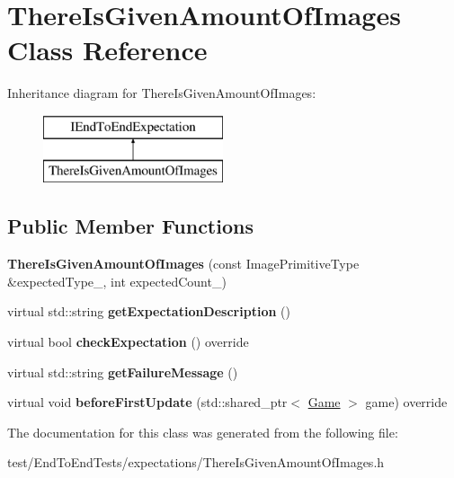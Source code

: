 \hypertarget{classThereIsGivenAmountOfImages}{}\section{There\+Is\+Given\+Amount\+Of\+Images Class Reference}
\label{classThereIsGivenAmountOfImages}
Inheritance diagram for There\+Is\+Given\+Amount\+Of\+Images\+:\begin{figure}[H]
\begin{center}
\leavevmode
\includegraphics[height=2.000000cm]{classThereIsGivenAmountOfImages}
\end{center}
\end{figure}
\subsection*{Public Member Functions}
\begin{DoxyCompactItemize}
\item 
{\bfseries There\+Is\+Given\+Amount\+Of\+Images} (const Image\+Primitive\+Type \&expected\+Type\+\_\+, int expected\+Count\+\_\+)\hypertarget{classThereIsGivenAmountOfImages_abf27407b6d0804b261b1e9d75872e850}{}\label{classThereIsGivenAmountOfImages_abf27407b6d0804b261b1e9d75872e850}

\item 
virtual std\+::string {\bfseries get\+Expectation\+Description} ()\hypertarget{classThereIsGivenAmountOfImages_aa34b89b7365253d231ea30862d75b0d7}{}\label{classThereIsGivenAmountOfImages_aa34b89b7365253d231ea30862d75b0d7}

\item 
virtual bool {\bfseries check\+Expectation} () override\hypertarget{classThereIsGivenAmountOfImages_a68602371fa849aeaf59719480d88d29a}{}\label{classThereIsGivenAmountOfImages_a68602371fa849aeaf59719480d88d29a}

\item 
virtual std\+::string {\bfseries get\+Failure\+Message} ()\hypertarget{classThereIsGivenAmountOfImages_a437f016061ad23c82c9bd12a2d9cff32}{}\label{classThereIsGivenAmountOfImages_a437f016061ad23c82c9bd12a2d9cff32}

\item 
virtual void {\bfseries before\+First\+Update} (std\+::shared\+\_\+ptr$<$ \hyperlink{classGame}{Game} $>$ game) override\hypertarget{classThereIsGivenAmountOfImages_a5574f8aa96c94de9f6adc447591de7a4}{}\label{classThereIsGivenAmountOfImages_a5574f8aa96c94de9f6adc447591de7a4}

\end{DoxyCompactItemize}


The documentation for this class was generated from the following file\+:\begin{DoxyCompactItemize}
\item 
test/\+End\+To\+End\+Tests/expectations/There\+Is\+Given\+Amount\+Of\+Images.\+h\end{DoxyCompactItemize}
